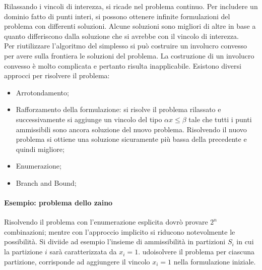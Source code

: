 \documentclass{article}
\begin{document}
Rilassando i vincoli di interezza, si ricade nel problema continuo. Per 
includere un dominio fatto di punti interi, si possono ottenere infinite 
formulazioni del problema con differenti soluzioni. Alcune soluzioni sono 
migliori di altre in base a quanto differiscono dalla soluzione che si avrebbe
con il vincolo di interezza.\\ 
Per riutilizzare l'algoritmo del simplesso si può costruire un involucro 
convesso per avere sulla frontiera le soluzioni del problema. La costruzione 
di un involucro convesso è molto complicata e pertanto risulta inapplicabile.
Esistono diversi approcci per risolvere il problema:
\begin{itemize}
  \item Arrotondamento;
  \item Rafforzamento della formulazione: si risolve il problema rilassato e 
    successivamente si aggiunge un vincolo del tipo $\alpha x \leq \beta$ tale 
    che tutti i punti ammissibili sono ancora soluzione del nuovo problema. 
    Risolvendo il nuovo problema si ottiene una soluzione sicuramente più bassa 
    della precedente e quindi migliore;
  \item Enumerazione;
  \item Branch and Bound;
\end{itemize}

\paragraph{Esempio: problema dello zaino}

Risolvendo il problema con l'enumerazione esplicita dovrò provare $2^n$
combinazioni; mentre con l'approccio implicito si riducono notevolmente le 
possibilità. Si diviide ad esempio l'insieme di ammissibilità in 
partizioni $S_i$ in cui la partizione $i$ sarà caratterizzata da $x_i = 1$. 
udoisolvere il problema per ciascuna partizione, corrisponde ad aggiungere il 
vincolo $x_i = 1$ nella formulazione iniziale.
\end{document}
